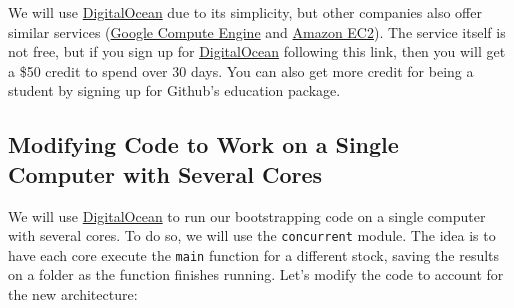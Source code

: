 \documentclass[12pt, a4paper]{article}
\begin{document}
We will use \href{https://m.do.co/c/c2080c9faccc}{DigitalOcean} due to its simplicity, but other companies also offer similar services (\href{https://cloud.google.com/compute/}{Google Compute Engine} and \href{https://aws.amazon.com/ec2/}{Amazon EC2}).
The service itself is not free, but if you sign up for \href{https://m.do.co/c/c2080c9faccc}{DigitalOcean} following this link, then you will get a \$50 credit to spend over 30 days.
You can also get more credit for being a student by signing up for Github's education package.
\subsection{Modifying Code to Work on a Single Computer with Several Cores}
\label{sec:org9c4b9c4}
We will use \href{https://m.do.co/c/c2080c9faccc}{DigitalOcean} to run our bootstrapping code on a single computer with several cores.
To do so, we will use the \texttt{concurrent} module.
The idea is to have each core execute the \texttt{main} function for a different stock, saving the results on a folder as the function finishes running.
Let's modify the code to account for the new architecture:
\lstset{language=jupyter-python,label= ,caption= ,captionpos=b,numbers=none}
\end{document}
